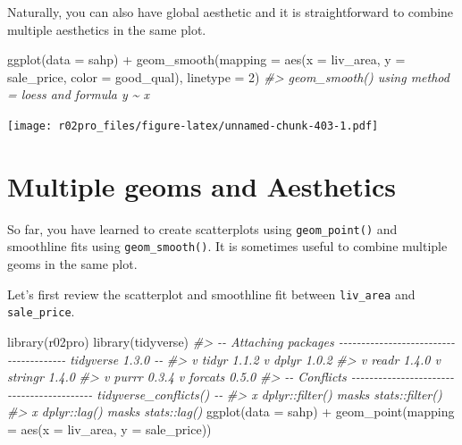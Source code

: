 \documentclass[
]{book}
\newenvironment{Shaded}{\begin{snugshade}}{\end{snugshade}}
\newcommand{\AttributeTok}[1]{\textcolor[rgb]{0.77,0.63,0.00}{#1}}
\newcommand{\CommentTok}[1]{\textcolor[rgb]{0.56,0.35,0.01}{\textit{#1}}}
\newcommand{\DecValTok}[1]{\textcolor[rgb]{0.00,0.00,0.81}{#1}}
\newcommand{\FunctionTok}[1]{\textcolor[rgb]{0.00,0.00,0.00}{#1}}
\newcommand{\NormalTok}[1]{#1}
\newcommand{\SpecialCharTok}[1]{\textcolor[rgb]{0.00,0.00,0.00}{#1}}
\begin{document}
Naturally, you can also have global aesthetic and it is straightforward to combine multiple aesthetics in the same plot.

\begin{Shaded}
\begin{Highlighting}[]
\FunctionTok{ggplot}\NormalTok{(}\AttributeTok{data =}\NormalTok{ sahp) }\SpecialCharTok{+} \FunctionTok{geom\_smooth}\NormalTok{(}\AttributeTok{mapping =} \FunctionTok{aes}\NormalTok{(}\AttributeTok{x =}\NormalTok{ liv\_area, }\AttributeTok{y =}\NormalTok{ sale\_price, }\AttributeTok{color =}\NormalTok{ good\_qual), }\AttributeTok{linetype =} \DecValTok{2}\NormalTok{)}
\CommentTok{\#\textgreater{} \textasciigrave{}geom\_smooth()\textasciigrave{} using method = \textquotesingle{}loess\textquotesingle{} and formula \textquotesingle{}y \textasciitilde{} x\textquotesingle{}}
\end{Highlighting}
\end{Shaded}

\texttt{[image: r02pro\_files/figure-latex/unnamed-chunk-403-1.pdf]}

\hypertarget{multi-geom}{%
\section{Multiple geoms and Aesthetics}\label{multi-geom}}

So far, you have learned to create scatterplots using \texttt{geom\_point()} and smoothline fits using \texttt{geom\_smooth()}. It is sometimes useful to combine multiple geoms in the same plot.

Let's first review the scatterplot and smoothline fit between \texttt{liv\_area} and \texttt{sale\_price}.

\begin{Shaded}
\begin{Highlighting}[]
\FunctionTok{library}\NormalTok{(r02pro)}
\FunctionTok{library}\NormalTok{(tidyverse)}
\CommentTok{\#\textgreater{} {-}{-} Attaching packages {-}{-}{-}{-}{-}{-}{-}{-}{-}{-}{-}{-}{-}{-}{-}{-}{-}{-}{-}{-}{-}{-}{-}{-}{-}{-}{-}{-}{-}{-}{-}{-}{-}{-}{-}{-}{-}{-}{-} tidyverse 1.3.0 {-}{-}}
\CommentTok{\#\textgreater{} v tidyr   1.1.2     v dplyr   1.0.2}
\CommentTok{\#\textgreater{} v readr   1.4.0     v stringr 1.4.0}
\CommentTok{\#\textgreater{} v purrr   0.3.4     v forcats 0.5.0}
\CommentTok{\#\textgreater{} {-}{-} Conflicts {-}{-}{-}{-}{-}{-}{-}{-}{-}{-}{-}{-}{-}{-}{-}{-}{-}{-}{-}{-}{-}{-}{-}{-}{-}{-}{-}{-}{-}{-}{-}{-}{-}{-}{-}{-}{-}{-}{-}{-}{-}{-} tidyverse\_conflicts() {-}{-}}
\CommentTok{\#\textgreater{} x dplyr::filter() masks stats::filter()}
\CommentTok{\#\textgreater{} x dplyr::lag()    masks stats::lag()}
\FunctionTok{ggplot}\NormalTok{(}\AttributeTok{data =}\NormalTok{ sahp) }\SpecialCharTok{+} \FunctionTok{geom\_point}\NormalTok{(}\AttributeTok{mapping =} \FunctionTok{aes}\NormalTok{(}\AttributeTok{x =}\NormalTok{ liv\_area, }\AttributeTok{y =}\NormalTok{ sale\_price))}
\end{Highlighting}
\end{Shaded}
\end{document}

